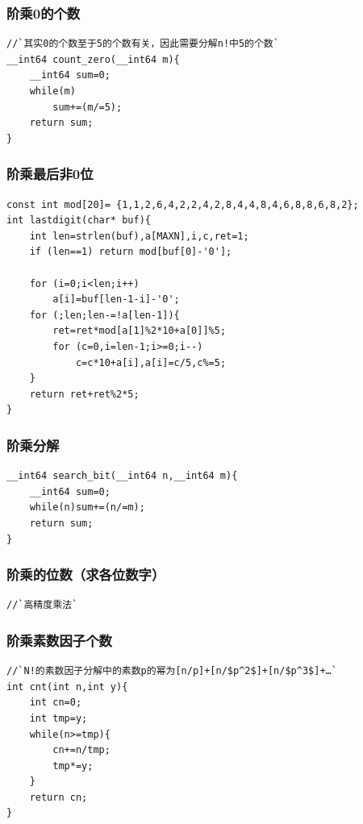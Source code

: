 \documentclass[a4paper]{article}
\begin{document}
\begin{CJK*}{UTF8}{gbsn}
\begin{multicols}{3}
\begin{flushleft}
\subsubsection{阶乘0的个数}
\begin{lstlisting}
//`其实0的个数至于5的个数有关，因此需要分解n!中5的个数`
__int64 count_zero(__int64 m){
	__int64 sum=0;
	while(m)
		sum+=(m/=5);
	return sum;
}
\end{lstlisting}


\subsubsection{阶乘最后非0位}
\begin{lstlisting}
const int mod[20]= {1,1,2,6,4,2,2,4,2,8,4,4,8,4,6,8,8,6,8,2}; 
int lastdigit(char* buf){ 
    int len=strlen(buf),a[MAXN],i,c,ret=1; 
    if (len==1) return mod[buf[0]-'0']; 
    
    for (i=0;i<len;i++) 
        a[i]=buf[len-1-i]-'0'; 
    for (;len;len-=!a[len-1]){ 
        ret=ret*mod[a[1]%2*10+a[0]]%5; 
        for (c=0,i=len-1;i>=0;i--) 
            c=c*10+a[i],a[i]=c/5,c%=5; 
    } 
    return ret+ret%2*5; 
}
\end{lstlisting}


\subsubsection{阶乘分解}
\begin{lstlisting}
__int64 search_bit(__int64 n,__int64 m){
	__int64 sum=0;
	while(n)sum+=(n/=m);
	return sum;
}
\end{lstlisting}


\subsubsection{阶乘的位数（求各位数字）}
\begin{lstlisting}
//`高精度乘法`
\end{lstlisting}


\subsubsection{阶乘素数因子个数}
\begin{lstlisting}
//`N!的素数因子分解中的素数p的幂为[n/p]+[n/$p^2$]+[n/$p^3$]+…`
int cnt(int n,int y){
    int cn=0;
    int tmp=y;
    while(n>=tmp){
        cn+=n/tmp;
        tmp*=y;
    }
    return cn;
}
\end{lstlisting}


\end{flushleft}
\end{multicols}
\end{CJK*}
\end{document}
